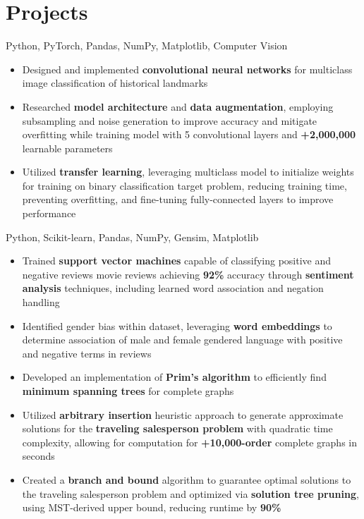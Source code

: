 \documentclass[letterpaper,11pt]{article}
\begin{document}
\section{Projects}
{Python, PyTorch, Pandas, NumPy, Matplotlib, Computer Vision}{}
\begin{itemize}
    \item Designed and implemented \textbf{convolutional neural networks} for multiclass
          image classification of historical landmarks
    \item Researched \textbf{model architecture} and \textbf{data augmentation},
          employing subsampling and noise generation to improve accuracy and mitigate
          overfitting while training model with 5 convolutional layers and
          \textbf{+2,000,000} learnable parameters
    \item Utilized \textbf{transfer learning}, leveraging multiclass model to initialize
          weights for training on binary classification target problem, reducing training
          time, preventing overfitting, and fine-tuning fully-connected layers to improve
          performance
\end{itemize}
{Python, Scikit-learn, Pandas, NumPy, Gensim, Matplotlib}{}
\begin{itemize}
    \item Trained \textbf{support vector machines} capable of classifying positive and
          negative reviews movie reviews achieving \textbf{92\%} accuracy through
          \textbf{sentiment analysis} techniques, including learned word association and
          negation handling
    \item Identified gender bias within dataset, leveraging \textbf{word embeddings} to
          determine association of male and female gendered language with positive and
          negative terms in reviews
\end{itemize}
\begin{itemize}
    \item Developed an implementation of \textbf{Prim's algorithm} to efficiently find
          \textbf{minimum spanning trees} for complete graphs
    \item Utilized \textbf{arbitrary insertion} heuristic approach to generate
          approximate solutions for the \textbf{traveling salesperson problem} with
          quadratic time complexity, allowing for computation for \textbf{+10,000-order}
          complete graphs in seconds
    \item Created a \textbf{branch and bound} algorithm to guarantee optimal solutions to
          the traveling salesperson problem and optimized via \textbf{solution tree
              pruning}, using MST-derived upper bound, reducing runtime by \textbf{90\%}
\end{itemize}
\end{document}
